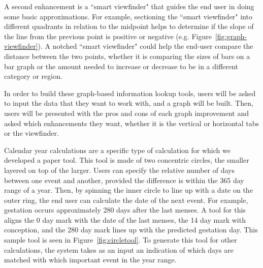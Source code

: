 \documentclass{sig-alternate}
\begin{document}
A second enhancement is a ``smart viewfinder" that guides the end user in doing some basic approximations. For example, sectioning the ``smart viewfinder" into different quadrants in relation to the midpoint helps to determine if the slope of the line from the previous point is positive or negative (e.g. Figure~\ref{fig:graph-viewfinder}). A notched ``smart viewfinder" could help the end-user compare the distance between the two points, whether it is comparing the sizes of bars on a bar graph or the amount needed to increase or decrease to be in a different category or region.

In order to build these graph-based information lookup tools, users will be asked to input the data that they want to work with, and a graph will be built. Then, users will be presented with the pros and cons of each graph improvement and asked which enhancements they want, whether it is the vertical or horizontal tabs or the viewfinder. 

Calendar year calculations are a specific type of calculation for which we developed a paper tool. This tool is made of two concentric circles, the smaller layered on top of the larger. Users can specify the relative number of days between one event and another, provided the difference is within the 365 day range of a year. Then, by spinning the inner circle to line up with a date on the outer ring, the end user can calculate the date of the next event. For example, gestation occurs approximately 280 days after the last menses. A tool for this aligns the 0 day mark with the date of the last menses, the 14 day mark with conception, and the 280 day mark lines up with the predicted gestation day. This sample tool is seen in Figure~\ref{fig:circletool}. To generate this tool for other calculations, the \nifty system takes as an input an indication of which days are matched with which important event in the year range.
\end{document}
